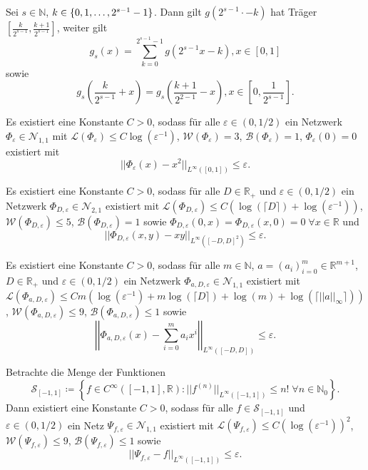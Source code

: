 \documentclass[11pt]{scrartcl}
\newcommand{\N}{\mathbb{N}} %
\newcommand{\R}{\mathbb{R}} %
\begin{document}
\begin{lemma}
    Sei \(s\in\N\), \(k \in \{0,1,\ldots, 2^{s-1}-1\}\). Dann gilt \(g(2^{s-1} \cdot - k)\) 
    hat Träger \([\frac{k}{2^{s-1}}, \frac{k+1}{2^{s-1}}]\), weiter gilt 
    \[ g_s(x) = \sum_{k=0}^{2^{s-1}-1} g(2^{s-1}x - k), x\in [0,1] \]
    sowie 
    \[ g_s(\frac{k}{2^{s-1}}+x) = g_s(\frac{k+1}{2^{2-1}} - x), x \in [0, \frac{1}{2^{s-1}}]. \]
\end{lemma}

\begin{proposition} %
    Es existiert eine Konstante \(C>0\), sodass für alle \(\varepsilon \in (0,1/2)\) 
    ein Netzwerk \(\Phi_\varepsilon \in \mathcal{N}_{1,1}\) mit 
    \(\mathcal{L}(\Phi_\varepsilon) \leq C\log(\varepsilon^{-1})\), 
    \(\mathcal{W}(\Phi_\varepsilon) = 3\), \(\mathcal{B}(\Phi_\varepsilon) = 1\), 
    \(\Phi_\varepsilon(0) = 0\) existiert mit 
    \[ ||\Phi_\varepsilon(x) - x^2 ||_{L^\infty([0,1])} \leq \varepsilon. \]
\end{proposition}

\begin{proposition} %
    Es existiert eine Konstante \(C>0\), sodass für alle \(D\in \R_+\) und \(\varepsilon \in (0, 1/2)\) 
    ein Netzwerk \(\Phi_{D,\varepsilon} \in \mathcal{N}_{2,1}\) existiert mit 
    \(\mathcal{L}(\Phi_{D, \varepsilon}) \leq C (\log(\lceil D \rceil) + \log(\varepsilon^{-1})) \), 
    \(\mathcal{W}(\Phi_{D, \varepsilon}) \leq 5\), \(\mathcal{B}(\Phi_{D, \varepsilon}) = 1\) sowie 
    \(\Phi_{D,\varepsilon}(0,x) = \Phi_{D,\varepsilon}(x,0) = 0 \;\forall x\in \R\) und 
    \[ ||\Phi_{D,\varepsilon}(x,y) - xy||_{L^\infty([-D,D]^2)} \leq \varepsilon. \]
\end{proposition}

\begin{proposition} %
    \newcommand{\Phia}{\Phi_{a,D,\varepsilon}}
    Es existiert eine Konstante \(C>0\), sodass für alle \(m\in \N\), \(a = (a_i)_{i=0}^m \in \R^{m+1}\), 
    \(D\in \R_+\) und \(\varepsilon \in (0,1/2)\) ein Netzwerk \(\Phia \in \mathcal{N}_{1,1}\) 
    existiert mit \(\mathcal{L}(\Phia) \leq C m (\log(\varepsilon^{-1}) + m\log(\lceil D \rceil) + \log(m) + \log(\lceil ||a||_\infty \rceil))\), 
    \(\mathcal{W}(\Phia) \leq 9\), \(\mathcal{B}(\Phia) \leq 1\) sowie 
    \[ \left|\left|\Phia(x) - \sum_{i=0}^m a_i x^i \right|\right|_{L^\infty([-D,D])} \leq \varepsilon. \]
\end{proposition}

\begin{lemma} %
    Betrachte die Menge der Funktionen 
    \[ \mathcal{S}_{[-1,1]} \coloneqq \left\{ f \in C^\infty([-1,1], \R): ||f^{(n)}||_{L^\infty([-1,1])} \leq n! \;\forall n \in \N_0 \right\}. \]
    Dann existiert eine Konstante \(C>0\), sodass für alle \(f\in \mathcal{S}_{[-1,1]}\) und \(\varepsilon\in (0,1/2)\) 
    ein Netz \(\Psi_{f,\varepsilon} \in \mathcal{N}_{1,1}\) existiert mit 
    \( \mathcal{L}(\Psi_{f,\varepsilon}) \leq C(\log(\varepsilon^{-1}))^2 \), 
    \(\mathcal{W}(\Psi_{f,\varepsilon}) \leq 9\), \(\mathcal{B}(\Psi_{f,\varepsilon}) \leq 1\) 
    sowie 
    \[ ||\Psi_{f,\varepsilon} - f||_{L^\infty([-1,1])} \leq \varepsilon. \]
\end{lemma}
\end{document}
